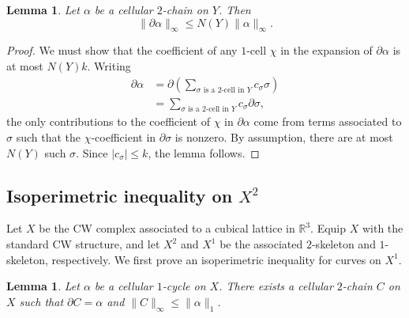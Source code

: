 \documentclass[12pt]{amsart}
\newtheorem{lemma}[theorem]{Lemma}
\theoremstyle{definition}
\begin{document}
\begin{lemma}\label{boundary of k embedded chain} Let $\alpha$ be a cellular $2$-chain on $Y$. Then $$\|\partial \alpha\|_\infty\leq N(Y)\|\alpha\|_\infty.$$
\end{lemma}

\begin{proof} We must show that the coefficient of any $1$-cell $\chi$ in the expansion of $\partial \alpha$ is at most $N(Y)k$. Writing 
\begin{align*}\partial\alpha&=\partial\left(\sum_{\sigma \text{ is a }2\text{-cell in } Y}c_\sigma \sigma\right)\\&=\sum_{\sigma \text{ is a }2\text{-cell in } Y}c_\sigma \partial \sigma,
\end{align*} the only contributions to the coefficient of $\chi$ in $\partial \alpha$ come from terms associated to $\sigma$ such that the $\chi$-coefficient in $\partial \sigma$ is nonzero. By assumption, there are at most $N(Y)$ such $\sigma$. Since $|c_\sigma|\leq k$, the lemma follows.
\end{proof}

\subsection{Isoperimetric inequality on $X^2$} Let $X$ be the CW complex associated to a cubical lattice in $\mathbb{R}^3$. Equip $X$ with the standard CW structure, and let $X^2$ and $X^1$ be the associated $2$-skeleton and $1$-skeleton, respectively. We first prove an isoperimetric inequality for curves on $X^1$.

\begin{lemma} \label{isoperimetric inequality on X^1} Let $\alpha$ be a cellular $1$-cycle on $X$. There exists a cellular $2$-chain $C$ on $X$ such that $\partial C=\alpha$ and $\|C\|_\infty\leq \|\alpha\|_1$.
\end{lemma}
\end{document}
